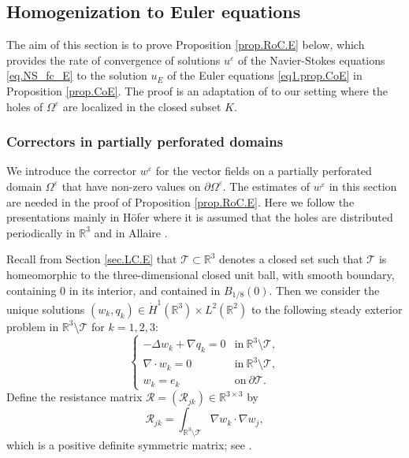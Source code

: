 \documentclass[11pt,a4paper]{article}
\numberwithin{equation}{section}
\newcommand{\R}{\mathbb{R}}
\newcommand{\eps}{\varepsilon}
\begin{document}
    \subsection{Homogenization to Euler equations}
    \label{sec.Homogenization.E}


The aim of this section is to prove Proposition \ref{prop.RoC.E} below, which provides the rate of convergence of solutions $u^\eps$ of the Navier-Stokes equations \eqref{eq.NS_fc_E} to the solution $u_E$ of the Euler equations \eqref{eq1.prop.CoE} in Proposition \ref{prop.CoE}. The proof is an adaptation of \cite[Proof of Theorem 1.2]{Hof23} to our setting where the holes of $\Omega^\eps$ are localized in the closed subset $K$.


    \subsubsection{Correctors in partially perforated domains}
    \label{sec.corr}


We introduce the corrector $w^\eps$ for the vector fields on a partially perforated domain $\Omega^\eps$ that have non-zero values on $\partial \Omega^\eps$. The estimates of $w^\eps$ in this section are needed in the proof of Proposition \ref{prop.RoC.E}. Here we follow the presentations mainly in H\"{o}fer \cite[Section 2]{Hof23} where it is assumed that the holes are distributed periodically in $\R^3$ and in Allaire \cite{All90a,All90b}. 


Recall from Section \ref{sec.LC.E} that $\mathcal{T}\subset \R^3$ denotes a closed set such that $\mathcal{T}$ is homeomorphic to the three-dimensional closed unit ball, with smooth boundary, containing $0$ in its interior, and contained in $B_{1/8}(0)$. Then we consider the unique solutions $(w_k,q_k)\in \dot{H}^1(\mathbb{R}^3)\times L^2(\mathbb{R}^2)$ to the following steady exterior problem in $\R^3\setminus \mathcal{T}$ for $k=1,2,3$: 
\[
    \left\{
    \begin{array}{ll}
    -\Delta w_k + \nabla q_k = 0 &\mbox{in}\ \R^3\setminus \mathcal{T},\\
    \nabla\cdot w_k = 0 &\mbox{in}\ \R^3\setminus \mathcal{T},\\
    w_k = e_k &\mbox{on}\ \partial\mathcal{T}.
\end{array}\right.
\]
Define the resistance matrix $\mathcal{R} = (\mathcal{R}_{jk})\in\R^{3\times3}$ by 
\begin{equation}\label{resis.mat}
    \mathcal{R}_{jk}
    = \int_{\R^3\setminus \mathcal{T}}
    \nabla w_k \cdot \nabla w_j, 
\end{equation}
which is a positive definite symmetric matrix; see \cite[Proposition 1.1.2]{All90a}. 
\end{document}
